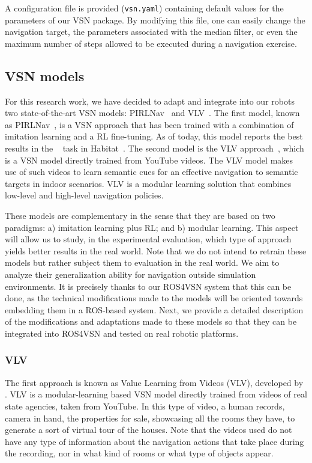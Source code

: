 A configuration file is provided (\texttt{vsn.yaml}) containing default values for the parameters of our VSN package.
By modifying this file, one can easily change the navigation target, the parameters associated with the median filter, or even the maximum number of steps allowed to be executed during a navigation exercise.


\subsection{VSN models}\label{subsec:vsn_models}
For this research work, we have decided to adapt and integrate into our robots two state-of-the-art VSN models: PIRLNav~\cite{ramrakhya2023} and VLV~\cite{chang2020}.
The first model, known as PIRLNav~\cite{ramrakhya2023}, is a VSN approach that has been trained with a combination of imitation learning and a RL fine-tuning.
As of today, this model reports the best results in the \objnav~\cite{batra2020} task in Habitat~\cite{NEURIPS2021_021bbc7e}.
The second model is the VLV approach~\cite{chang2020}, which is a VSN model directly trained from YouTube videos.
The VLV model makes use of such videos to learn semantic cues for an effective navigation to semantic targets in indoor scenarios.
VLV is a modular learning solution that combines low-level and high-level navigation policies.

These models are complementary in the sense that they are based on two paradigms: a) imitation learning plus RL; and b) modular learning.
This aspect will allow us to study, in the experimental evaluation, which type of approach yields better results in the real world.
Note that we do not intend to retrain these models but rather subject them to evaluation in the real world.
We aim to analyze their generalization ability for navigation outside simulation environments.
It is precisely thanks to our ROS4VSN system that this can be done, as the technical modifications made to the models will be oriented towards embedding them in a ROS-based system.
Next, we provide a detailed description of the modifications and adaptations made to these models so that they can be integrated into ROS4VSN and tested on real robotic platforms.

\subsubsection{VLV}

The first approach is known as Value Learning from Videos (\textsc{VLV}), developed by \cite{chang2020}.
VLV is a modular-learning based VSN model directly trained from videos of real state agencies, taken from YouTube.
In this type of video, a human records, camera in hand, the properties for sale, showcasing all the rooms they have, to generate a sort of virtual tour of the houses.
Note that the videos used do not have any type of information about the navigation actions that take place during the recording, nor in what kind of rooms or what type of objects appear.

